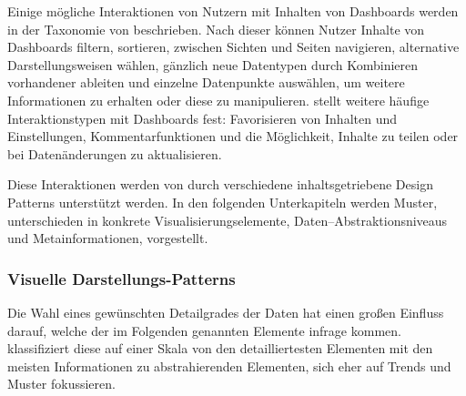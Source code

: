 Einige mögliche Interaktionen von Nutzern mit Inhalten von Dashboards werden in der Taxonomie von \autocite[S. 1]{Heer.InteractiveDynamicsVisualAnalysis.2012} beschrieben.
Nach dieser können Nutzer Inhalte von Dashboards filtern, sortieren, zwischen Sichten und Seiten navigieren, alternative Darstellungsweisen wählen, gänzlich neue Datentypen durch Kombinieren vorhandener ableiten und einzelne Datenpunkte auswählen, um weitere Informationen zu erhalten oder diese zu manipulieren.
\autocite[S. 25]{MarcusHomannVassilenaBanovaPaulOelbermannHolgerWittgesandHelmutKrcmar.TowardsUserInterfaceComponentsforDashboardApplicationsonSmartphones.2013} stellt weitere häufige Interaktionstypen mit Dashboards fest:
Favorisieren von Inhalten und Einstellungen, Kommentarfunktionen und die Möglichkeit, Inhalte zu teilen oder bei Datenänderungen zu aktualisieren.

Diese Interaktionen werden von durch verschiedene inhaltsgetriebene Design Patterns unterstützt werden.
In den folgenden Unterkapiteln werden Muster, unterschieden in konkrete Visualisierungselemente, Daten--Abstraktionsniveaus und Metainformationen, vorgestellt.

\subsubsection{Visuelle Darstellungs-Patterns}

Die Wahl eines gewünschten Detailgrades der Daten hat einen großen Einfluss darauf, welche der im Folgenden genannten Elemente infrage kommen.
\autocite[S. 3]{Bach.DashboardDesignPatterns.2023} klassifiziert diese auf einer Skala von den detailliertesten Elementen mit den meisten Informationen zu abstrahierenden Elementen, sich eher auf Trends und Muster fokussieren.

